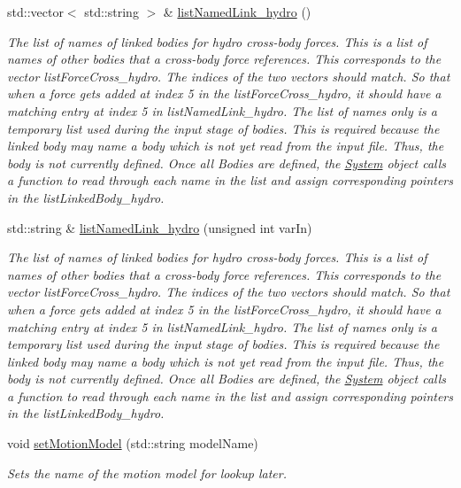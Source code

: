 \begin{DoxyCompactItemize}
std\-::vector$<$ std\-::string $>$ \& \hyperlink{classosea_1_1ofreq_1_1_body_abc4abd052a3776123df114c6faf34bae}{list\-Named\-Link\-\_\-hydro} ()
\begin{DoxyCompactList}\small\item\em The list of names of linked bodies for hydro cross-\/body forces. This is a list of names of other bodies that a cross-\/body force references. This corresponds to the vector list\-Force\-Cross\-\_\-hydro. The indices of the two vectors should match. So that when a force gets added at index 5 in the list\-Force\-Cross\-\_\-hydro, it should have a matching entry at index 5 in list\-Named\-Link\-\_\-hydro. The list of names only is a temporary list used during the input stage of bodies. This is required because the linked body may name a body which is not yet read from the input file. Thus, the body is not currently defined. Once all Bodies are defined, the \hyperlink{classosea_1_1ofreq_1_1_system}{System} object calls a function to read through each name in the list and assign corresponding pointers in the list\-Linked\-Body\-\_\-hydro. \end{DoxyCompactList}\item 
std\-::string \& \hyperlink{classosea_1_1ofreq_1_1_body_ad01b96bf575dde9f75f489c7118ca574}{list\-Named\-Link\-\_\-hydro} (unsigned int var\-In)
\begin{DoxyCompactList}\small\item\em The list of names of linked bodies for hydro cross-\/body forces. This is a list of names of other bodies that a cross-\/body force references. This corresponds to the vector list\-Force\-Cross\-\_\-hydro. The indices of the two vectors should match. So that when a force gets added at index 5 in the list\-Force\-Cross\-\_\-hydro, it should have a matching entry at index 5 in list\-Named\-Link\-\_\-hydro. The list of names only is a temporary list used during the input stage of bodies. This is required because the linked body may name a body which is not yet read from the input file. Thus, the body is not currently defined. Once all Bodies are defined, the \hyperlink{classosea_1_1ofreq_1_1_system}{System} object calls a function to read through each name in the list and assign corresponding pointers in the list\-Linked\-Body\-\_\-hydro. \end{DoxyCompactList}\item 
void \hyperlink{classosea_1_1ofreq_1_1_body_a8bbac7bdd98587b2d1cdab13f82f3d63}{set\-Motion\-Model} (std\-::string model\-Name)
\begin{DoxyCompactList}\small\item\em Sets the name of the motion model for lookup later. \end{DoxyCompactList}\item 

\end{DoxyCompactItemize}
